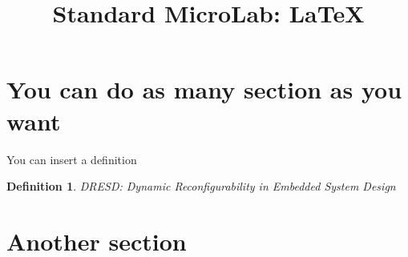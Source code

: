 \documentclass[a4paper,12pt]{article}
\newtheorem{Definition}{Definition}[section]
\begin{document}
\title{Standard MicroLab: \LaTeX }
\providecommand{\annoacc}{2010}



\newpage

\tableofcontents

\newpage

\listoffigures



\headsep 2cm
\hoffset -1cm
\textwidth 15cm
\setlength{\headwidth}{\textwidth}




\newpage



\newpage



\newpage


\newpage


\newpage


\newpage


\newpage


\section{You can do as many section as you want}
You can insert a definition
	\begin{Definition}
		DRESD: Dynamic Reconfigurability in Embedded System Design
	\end{Definition}
	
\newpage

\section{Another section}
\end{document}
